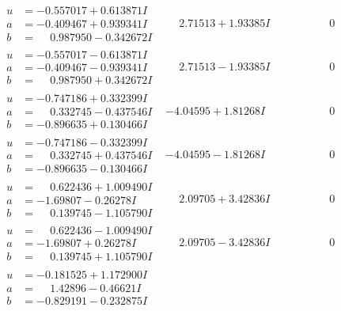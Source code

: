 \documentclass[1p]{elsarticle_modified}
\theoremstyle{definition}
\begin{document}
$$\begin{array}{c|c|c}
\begin{aligned}
u &= -0.557017 + 0.613871 I \\
a &= -0.409467 + 0.939341 I \\
b &= \phantom{-}0.987950 - 0.342672 I\end{aligned}
 & \phantom{-}2.71513 + 1.93385 I & \phantom{-0.000000 } 0 \\ \hline\begin{aligned}
u &= -0.557017 - 0.613871 I \\
a &= -0.409467 - 0.939341 I \\
b &= \phantom{-}0.987950 + 0.342672 I\end{aligned}
 & \phantom{-}2.71513 - 1.93385 I & \phantom{-0.000000 } 0 \\ \hline\begin{aligned}
u &= -0.747186 + 0.332399 I \\
a &= \phantom{-}0.332745 - 0.437546 I \\
b &= -0.896635 + 0.130466 I\end{aligned}
 & -4.04595 + 1.81268 I & \phantom{-0.000000 } 0 \\ \hline\begin{aligned}
u &= -0.747186 - 0.332399 I \\
a &= \phantom{-}0.332745 + 0.437546 I \\
b &= -0.896635 - 0.130466 I\end{aligned}
 & -4.04595 - 1.81268 I & \phantom{-0.000000 } 0 \\ \hline\begin{aligned}
u &= \phantom{-}0.622436 + 1.009490 I \\
a &= -1.69807 - 0.26278 I \\
b &= \phantom{-}0.139745 - 1.105790 I\end{aligned}
 & \phantom{-}2.09705 + 3.42836 I & \phantom{-0.000000 } 0 \\ \hline\begin{aligned}
u &= \phantom{-}0.622436 - 1.009490 I \\
a &= -1.69807 + 0.26278 I \\
b &= \phantom{-}0.139745 + 1.105790 I\end{aligned}
 & \phantom{-}2.09705 - 3.42836 I & \phantom{-0.000000 } 0 \\ \hline\begin{aligned}
u &= -0.181525 + 1.172900 I \\
a &= \phantom{-}1.42896 - 0.46621 I \\
b &= -0.829191 - 0.232875 I\end{aligned}

\end{array}$$
\end{document}
